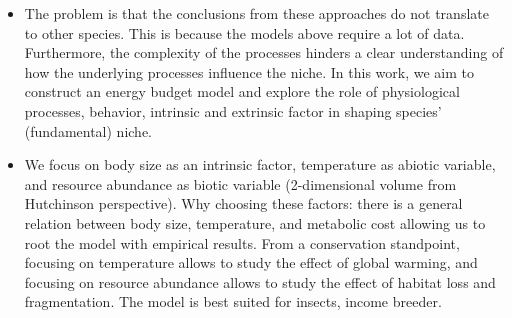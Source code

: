 \begin{itemize}
\item The problem is that the conclusions from these approaches do not translate to other species.
This is because the models above require a lot of data.
Furthermore, the complexity of the processes hinders a clear understanding of how the underlying processes influence the niche.
In this work, we aim to construct an energy budget model and explore the role of physiological processes, behavior, intrinsic and extrinsic factor in shaping species' (fundamental) niche.

\item We focus on body size as an intrinsic factor,  temperature as abiotic variable, and resource abundance as biotic variable (2-dimensional volume from Hutchinson perspective).
Why choosing these factors: there is a general relation between body size, temperature, and metabolic cost allowing us to root the model with empirical results.
From a conservation standpoint, focusing on temperature allows to study the effect of global warming, and focusing on resource abundance allows to study the effect of habitat loss and fragmentation.
The model is best suited for insects, income breeder.
\end{itemize}


